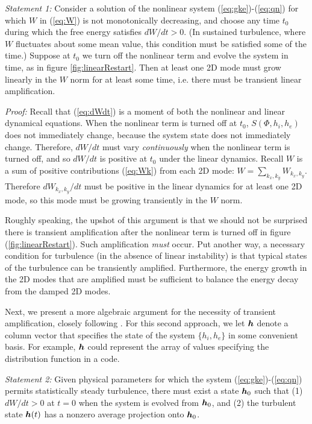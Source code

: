 \documentclass[12pt,superscriptaddress]{revtex4}
\newcommand{\vect}[1]{\mbox{\boldmath $#1$}}
\begin{document}
{\it Statement 1:} Consider a solution of the nonlinear system (\ref{eq:gke})-(\ref{eq:qn})
for which $W$ in (\ref{eq:W}) is not monotonically decreasing, and choose any
 time $t_0$ during which the free energy satisfies $dW/dt>0$.
(In sustained turbulence, where $W$ fluctuates about some mean value,
this condition must be satisfied some of the time.)  Suppose at $t_0$ we turn
off the nonlinear term
and evolve the system in time, as in figure \ref{fig:linearRestart}.
Then at least one 2D mode must grow linearly in the $W$ norm
for at least some time, i.e. there must be transient linear amplification.

{\it Proof:}
Recall that (\ref{eq:dWdt}) is a moment of both the nonlinear and linear dynamical equations.
When the nonlinear term is turned off at $t_0$, $S(\Phi,h_i,h_e)$ does not immediately change, because
the system state does not immediately change. Therefore, $dW/dt$ must vary \emph{continuously}
when the nonlinear term is turned off, and so $dW/dt$ is positive at $t_0$ under the linear dynamics.
Recall $W$ is a sum of positive contributions (\ref{eq:Wk}) from each 2D mode:
$W = \sum_{k_x,k_y} W_{k_x,k_y}$.
Therefore $dW_{k_x,k_y}/dt$ must be positive in the linear dynamics for at least one 2D mode,
so this mode must be growing transiently in the $W$ norm.

Roughly speaking, the upshot of this argument is that we should not be surprised there is transient amplification
after the nonlinear term is turned off in figure (\ref{fig:linearRestart}).
Such amplification \emph{must} occur.
Put another way, a necessary condition
for turbulence (in the absence of linear instability) is that typical states of the turbulence
can be transiently amplified. Furthermore, the energy growth in the 2D modes that are amplified
must be sufficient to balance the energy decay from the damped 2D modes.

Next, we present a more algebraic argument for the necessity of transient amplification, closely
following \cite{DelSoleNecessity}.  For this second approach, we let $\vect{h}$ denote
a column vector that specifies the state of the system $\{h_i,h_e\}$ in some convenient basis.
For example, $\vect{h}$ could represent the array of values specifying the distribution function in a code.

{\it Statement 2:} Given physical parameters for which
the system (\ref{eq:gke})-(\ref{eq:qn})
permits statistically steady turbulence,
there must exist a state $\vect{h}_0$ such that
(1) $dW/dt>0$ at $t=0$ when the system is evolved from $\vect{h}_0$, and
(2) the turbulent state $\vect{h}(t)$ has a nonzero average projection
onto $\vect{h}_0$.
\end{document}
